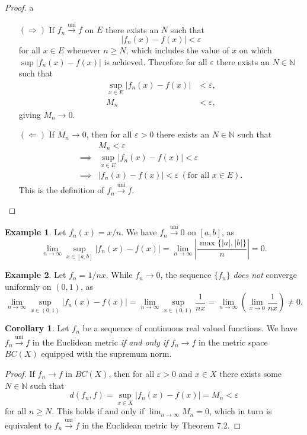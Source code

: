 \documentclass{article}
\newcommand{\N}{\mathbb{N}}
\newcommand{\uni}{\overset{\text{uni}}{\to}}
\theoremstyle{definition}
\newtheorem{corollary}{Corollary}[section]
\newtheorem{example}{Example}[section]
\begin{document}
\begin{proof}{\color{white}a}
	\begin{enumerate}
		\item [$ (\Longrightarrow) $] If $ f_n\uni f $ on $E$ there exists an $ N $ such that $$ |f_n(x)-f(x)|<\varepsilon$$ for all $ x\in E $ whenever $ n\ge N $, which includes the value of $ x $ on which $\sup |f_n(x)-f(x)| $ is achieved. Therefore for all $ \varepsilon $ there exists an $ N\in\N $ such that
		\begin{align*}
			\sup_{x\in E}|f_n(x)-f(x)|&<\varepsilon,\\M_n&<\varepsilon,
		\end{align*}
		giving $ M_n\to 0 $. 
		\item [$ (\Longleftarrow) $]  If $ M_n\to 0 $, then for all $ \varepsilon>0 $ there exists an $ N\in\N $ such that \begin{align*}
			&M_n<\varepsilon\\\implies&\sup_{x\in E}|f_n(x)-f(x)|<\varepsilon\\\implies& |f_n(x)-f(x)|<\varepsilon\ (\text{for all }x\in E).
		\end{align*} 
		This is the definition of $ f_n\uni f $. 
	\end{enumerate}
\end{proof}
\begin{example}
	Let $ f_n(x)=x/n $. We have $ f_n\uni 0 $ on $ [a,b] $, as $$ \lim\limits_{n\to\infty}\sup_{x\in [a,b]}|f_n(x)-f(x)|=\lim\limits_{n\to\infty}\left\lvert\frac{\max\{|a|,|b|\}}{n}\right\rvert=0.$$
\end{example}
\begin{example}
	Let $ f_n=1/nx $. While $ f_n\to 0 $, the sequence $ \{f_n\} $ \textit{does not} converge uniformly on $ (0,1) $, as $$ \lim\limits_{n\to\infty}\sup_{x\in (0,1)}|f_n(x)-f(x)|=\lim\limits_{n\to\infty}\sup_{x\in (0,1)}\frac{1}{nx}= \lim\limits_{n\to\infty}\left(\lim\limits_{x\to0}\frac{1}{nx}\right)\neq 0.$$
\end{example}
\begin{corollary}
	Let $ f_n $ be a sequence of continuous real valued functions. We have $ f_n\uni f $ in the Euclidean metric \textit{if and only if} $ f_n\to f $ in the metric space $ BC(X) $ equipped with the supremum norm.
\end{corollary}
\begin{proof}
	If $ f_n\to f $ in $ BC(X) $, then for all $ \varepsilon>0 $ and $ x\in X $ there exists some $ N\in\N $ such that $$ d(f_n,f)=\sup_{x\in X}|f_n(x)-f(x)|=M_n<\varepsilon$$ for all $ n\ge N $. This holds if and only if $ \lim_{n\to\infty}M_n=0 $, which in turn is equivalent to $ f_n\uni f $ in the Euclidean metric by Theorem 7.2.
\end{proof}
\end{document}
